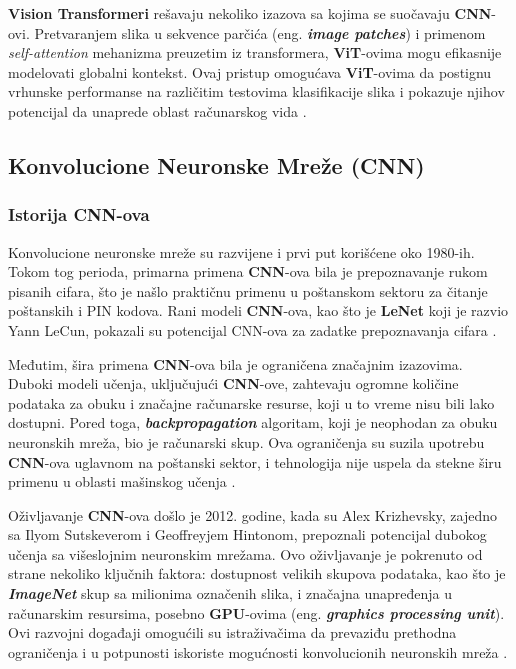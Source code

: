 \documentclass[12pt]{article}
\begin{document}
   \newpage

   \textbf{Vision Transformeri} rešavaju nekoliko izazova sa kojima se suočavaju \textbf{CNN}-ovi. 
   Pretvaranjem slika u sekvence parčića (eng. \textbf{\textit{image patches}}) i primenom \textit{self-attention} mehanizma preuzetim iz transformera, 
   \textbf{ViT}-ovima mogu efikasnije modelovati globalni kontekst. 
   Ovaj pristup omogućava \textbf{ViT}-ovima da postignu vrhunske performanse na različitim  
   testovima klasifikacije slika i pokazuje njihov potencijal da unaprede oblast računarskog vida \cite{vit}.

   \subsection{Konvolucione Neuronske Mreže (CNN)}
   \subsubsection{Istorija CNN-ova}
   Konvolucione neuronske mreže su razvijene 
   i prvi put korišćene oko 1980-ih. Tokom tog perioda, primarna primena 
   \textbf{CNN}-ova bila je prepoznavanje rukom pisanih cifara, što je našlo 
   praktičnu primenu u poštanskom sektoru za čitanje poštanskih i PIN kodova. 
   Rani modeli \textbf{CNN}-ova, kao što je \textbf{LeNet} \cite{lenet} koji je razvio Yann LeCun, pokazali su 
   potencijal CNN-ova za zadatke prepoznavanja cifara \cite{cnn_history}.

   Međutim, šira primena \textbf{CNN}-ova bila je ograničena značajnim izazovima. 
   Duboki modeli učenja, uključujući \textbf{CNN}-ove, zahtevaju ogromne količine 
   podataka za obuku i značajne računarske resurse, koji u to vreme nisu 
   bili lako dostupni. Pored toga, \textbf{\textit{backpropagation}} algoritam, 
   koji je neophodan za obuku neuronskih mreža, bio je računarski skup. 
   Ova ograničenja su suzila upotrebu \textbf{CNN}-ova uglavnom na poštanski sektor, 
   i tehnologija nije uspela da stekne širu primenu u oblasti mašinskog učenja \cite{cnn_history_2}.

   Oživljavanje \textbf{CNN}-ova došlo je 2012. godine, kada su Alex Krizhevsky, zajedno 
   sa Ilyom Sutskeverom i Geoffreyjem Hintonom, prepoznali potencijal dubokog 
   učenja sa višeslojnim neuronskim mrežama. Ovo oživljavanje je pokrenuto od strane nekoliko 
   ključnih faktora: dostupnost velikih skupova podataka, kao što je \textbf{\textit{ImageNet}} \cite{imagenet} skup sa 
   milionima označenih slika, i značajna unapređenja u računarskim resursima, posebno \textbf{GPU}-ovima 
   (eng. \textbf{\textit{graphics processing unit}}). Ovi razvojni događaji omogućili su istraživačima da prevaziđu prethodna ograničenja i u 
   potpunosti iskoriste mogućnosti konvolucionih neuronskih mreža \cite{cnn_history_2}.
\end{document}
